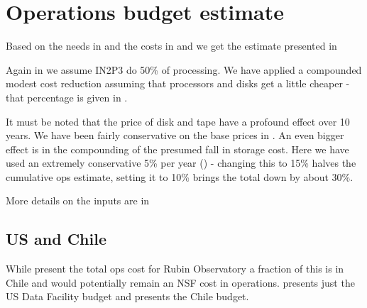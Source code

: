 \section{Operations budget estimate}\label{sec:opscost}
Based on the needs in  and the costs in  and 
we get the estimate presented in 



Again in  we assume IN2P3 do 50\% of processing.
We have applied a compounded modest cost reduction assuming that processors  and disks get a little cheaper - that
percentage is given in .

It must be noted that the price of disk and tape have a profound effect over 10 years. We have been fairly conservative on the base prices
in . An even bigger effect is in the compounding of the presumed fall in storage cost. Here we have used an extremely
conservative 5\% per year () - changing this to 15\% halves the cumulative ops estimate, setting it to 10\% brings the
total down by about 30\%.


More details on the inputs are in 

\subsection{US and Chile}
While  present the total ops cost for Rubin Observatory a fraction of this is in Chile and would potentially remain an NSF cost in operations.  presents just the US Data Facility budget  and
 presents the Chile budget.



